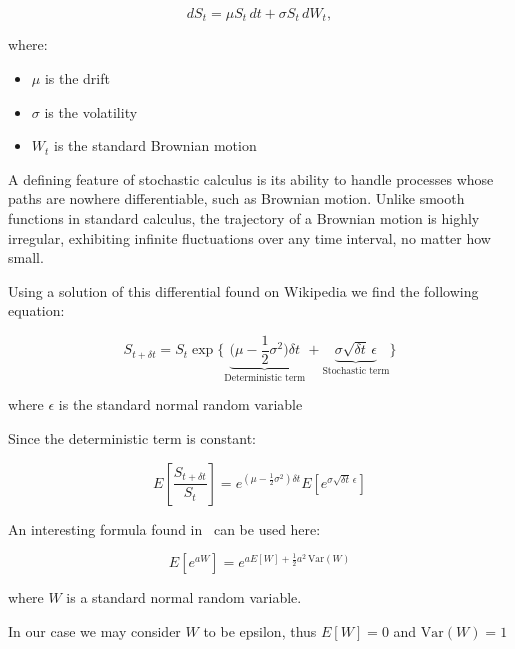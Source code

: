 \documentclass{article}
\begin{document}
    \[dS_t = \mu S_t\, dt + \sigma S_t\, dW_t,\]

    where:
    \begin{itemize}
        \item $\mu$ is the drift
        \item $\sigma$ is the volatility
        \item $W_t$ is the standard Brownian motion
    \end{itemize}

    \bigskip

    \begin{tcolorbox}[note, title=Stochastic Calculus]
        A defining feature of stochastic calculus is its ability to handle processes whose paths are nowhere differentiable, such as Brownian motion.
        Unlike smooth functions in standard calculus, the trajectory of a Brownian motion is highly irregular, exhibiting infinite fluctuations over any time interval, no matter how small.
    \end{tcolorbox}

    \bigskip

    Using a solution of this differential found on Wikipedia we find the following equation:

    \[
        S_{t+\delta t} = S_t \exp
        \bigg\{
        \underbrace{\bigg( \mu - \frac{1}{2} \sigma^2 \bigg) \delta t}_{\text{Deterministic term}}
        +
        \underbrace{\sigma \sqrt{\delta t} \, \epsilon}_{\text{Stochastic term}}
        \bigg\}
    \]

    where $\epsilon$ is the standard normal random variable

    \bigskip

    Since the deterministic term is constant:

    \[E\!\left[\frac{S_{t+\delta t}}{S_t}\right] = e^{\left( \mu - \frac{1}{2} \sigma^2 \right) \delta t} E\!\left[e^{\sigma \sqrt{\delta t} \, \epsilon}\right] \]

    \bigskip

    An interesting formula found in~\cite[p.~637]{Ross2010} can be used here:

    \[E\left[e^{aW}\right] = e^{a E[W] + \frac{1}{2} a^2 \, \text{Var}(W)}\]

    where $W$ is a standard normal random variable.

    \bigskip

    In our case we may consider $W$ to be epsilon, thus $E[W] = 0$ and $\text{Var}(W) = 1$
\end{document}
